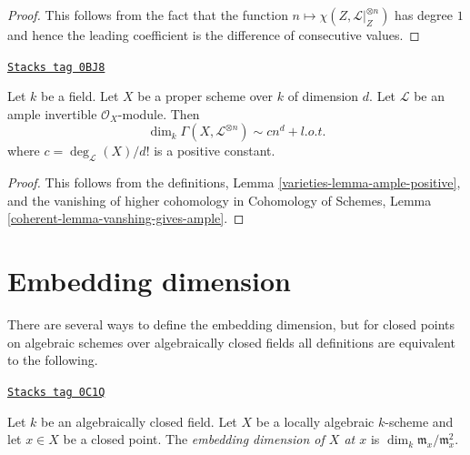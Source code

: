\begin{proof}
This follows from the fact that the function
$n \mapsto \chi(Z, \mathcal{L}|_Z^{\otimes n})$ has degree $1$
and hence the leading coefficient is the difference of consecutive values.
\end{proof}

\begin{proposition}

\label{varieties-proposition-asymptotic-riemann-roch}
\href{https://stacks.math.columbia.edu/tag/0BJ8}{\texttt{Stacks tag 0BJ8}}

Let $k$ be a field. Let $X$ be a proper scheme over $k$ of dimension $d$.
Let $\mathcal{L}$ be an ample invertible $\mathcal{O}_X$-module.
Then
$$
\dim_k \Gamma(X, \mathcal{L}^{\otimes n}) \sim c n^d + l.o.t.
$$
where $c = \deg_\mathcal{L}(X)/d!$ is a positive constant.
\end{proposition}

\begin{proof}

This follows from the definitions,
Lemma \ref{varieties-lemma-ample-positive}, and the vanishing
of higher cohomology in
Cohomology of Schemes, Lemma \ref{coherent-lemma-vanshing-gives-ample}.
\end{proof}

\section{Embedding dimension}
\label{varieties-section-embedding-dimension}
There are several ways to define the embedding dimension, but for
closed points on algebraic schemes over algebraically closed fields
all definitions are equivalent to the following.

\begin{definition}
\label{varieties-definition-embed-dim}
\href{https://stacks.math.columbia.edu/tag/0C1Q}{\texttt{Stacks tag 0C1Q}}

Let $k$ be an algebraically closed field. Let $X$ be a locally algebraic
$k$-scheme and let $x \in X$ be a closed point. The
{\it embedding dimension of $X$ at $x$} is
$\dim_k \mathfrak m_x/\mathfrak m_x^2$.
\end{definition}

